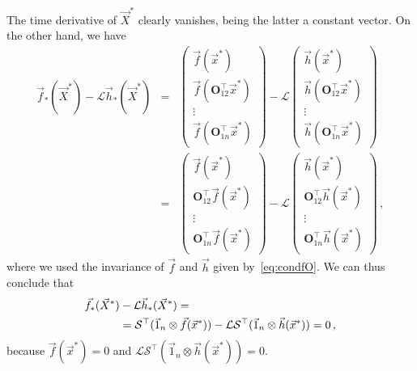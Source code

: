 \documentclass[aps,showpacs,preprintnumbers,amsmath,amssymb,twocolumn,superscriptaddress,floatfix,nofootinbib,10pt,pre]{revtex4-1}
\begin{document}
The time derivative of $\vec{X}^*$ clearly vanishes, being the latter a constant vector. On the other hand, we have
\begin{eqnarray*}
 \vec{f}_*(\vec{X}^*)-\mathcal{L}\vec{h}_*(\vec{X}^*)&=&\left(\begin{smallmatrix}
     \vec{f}(\vec{x}^*)\\ \vec{f}(\mathbf{O}^\top_{12}\vec{x}^*)\\\vdots\\ \vec{f}(\mathbf{O}^\top_{1n}\vec{x}^*)
 \end{smallmatrix}\right)-\mathcal{L}\left(\begin{smallmatrix}
     \vec{h}(\vec{x}^*)\\ \vec{h}(\mathbf{O}^\top_{12}\vec{x}^*)\\\vdots\\ \vec{h}(\mathbf{O}^\top_{1n}\vec{x}^*)
\end{smallmatrix}\right)\\
&=&\left(\begin{smallmatrix}
     \vec{f}(\vec{x}^*)\\ \mathbf{O}^\top_{12}\vec{f}(\vec{x}^*)\\\vdots\\ \mathbf{O}^\top_{1n}\vec{f}(\vec{x}^*)
 \end{smallmatrix}\right)-\mathcal{L}\left(\begin{smallmatrix}
     \vec{h}(\vec{x}^*)\\ \mathbf{O}^\top_{12}\vec{h}(\vec{x}^*)\\\vdots\\ \mathbf{O}^\top_{1n}\vec{h}(\vec{x}^*)
 \end{smallmatrix}\right)\,,
\end{eqnarray*}
where we used the invariance of $\vec{f}$ and $\vec{h}$ given by~\eqref{eq:condfO}. We can thus conclude that
\begin{align}
\label{eq:equil}
 \vec{f}_*(\vec{X}^*)&-\mathcal{L}\vec{h}_*(\vec{X}^*)=\\
&=\mathcal{S}^\top (\vec{1}_n\otimes \vec{f}(\vec{x}^*))-\mathcal{L}\mathcal{S}^\top (\vec{1}_n\otimes \vec{h}(\vec{x}^*))=0\notag\, ,
\end{align}
because $\vec{f}(\vec{x}^*)=0$ and $\mathcal{L}\mathcal{S}^\top (\vec{1}_n\otimes \vec{h}(\vec{x}^*))=0$.
\end{document}
